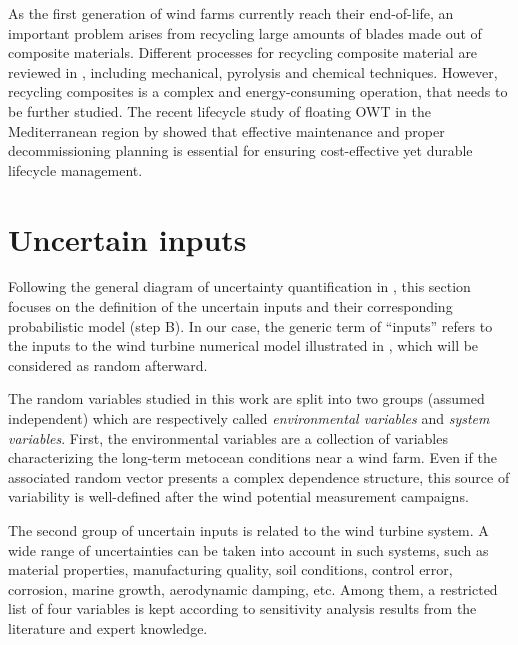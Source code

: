 As the first generation of wind farms currently reach their end-of-life, an important problem arises from recycling large amounts of blades made out of composite materials. 
Different processes for recycling composite material are reviewed in \citet{jensen_2018_blade_recycling}, including mechanical, pyrolysis and chemical techniques. 
However, recycling composites is a complex and energy-consuming operation, that needs to be further studied. 
The recent lifecycle study of floating OWT in the Mediterranean region by \citet{pulselli_2022_FOWT_lifecycle} showed that effective maintenance and 
proper decommissioning planning is essential for ensuring cost-effective yet durable lifecycle management.  




\section{Uncertain inputs} \label{sec:owt_uncertainties}

Following the general diagram of uncertainty quantification in , this section focuses on the definition of the uncertain inputs and their corresponding probabilistic model (step B). 
In our case, the generic term of ``inputs'' refers to the inputs to the wind turbine numerical model illustrated in , which will be considered as random afterward. 

The random variables studied in this work are split into two groups (assumed independent) which are respectively called \textit{environmental variables} and \textit{system variables}. 
First, the environmental variables are a collection of variables characterizing the long-term metocean conditions near a wind farm.
Even if the associated random vector presents a complex dependence structure, this source of variability is well-defined after the wind potential measurement campaigns. 

The second group of uncertain inputs is related to the wind turbine system. 
A wide range of uncertainties can be taken into account in such systems, such as material properties, manufacturing quality, soil conditions, control error, corrosion, marine growth, aerodynamic damping, etc.  
Among them, a restricted list of four variables is kept according to sensitivity analysis results from the literature and expert knowledge. 



